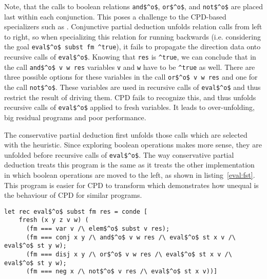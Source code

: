 Note, that the calls to boolean relations \lstinline{and$^o$}, \lstinline{or$^o$}, and \lstinline{not$^o$} are placed last within each conjunction.
This poses a challenge to the CPD-based specializers such as \ecce.
Conjunctive partial deduction unfolds relation calls from left to right, so when specializing this relation for running backwards (i.e. considering the goal \lstinline{eval$^o$ subst fm ^true}), it fails to propagate the direction data onto recursive calls of \lstinline{eval$^o$}.
Knowing that \lstinline{res} is \lstinline{^true}, we can conclude that in the call \lstinline{and$^o$ v w res} variables \lstinline{v} and \lstinline{w} have to be \lstinline{^true} as well.
There are three possible options for these variables in the call \lstinline{or$^o$ v w res} and one for the call \lstinline{not$^o$}.
These variables are used in recursive calls of \lstinline{eval$^o$} and thus restrict the result of driving them.
CPD fails to recognize this, and thus unfolds recursive calls of \lstinline{eval$^o$} applied to fresh variables.
It leads to over-unfolding, big residual programs and poor performance.

The conservative partial deduction first unfolds those calls which are selected with the heuristic.
Since exploring boolean operations makes more sense, they are unfolded before recursive calls of \lstinline{eval$^o$}.
The way conservative partial deduction treats this program is the same as it treats the other implementation in which boolean operations are moved to the left, as shown in listing~\ref{eval:fst}.
This program is easier for CPD to transform which demonstrates how unequal is the behaviour of CPD for similar programs.

\begin{figure*}[!h]
  \centering
  \begin{minipage}{0.95\textwidth}
    \begin{lstlisting}[label={eval:fst}, caption={Evaluator of formulas with boolean operation second}, captionpos=b, frame=tb]
  let rec eval$^o$ subst fm res = conde [
    fresh (x y z v w) (
      (fm === var v /\ elem$^o$ subst v res);
      (fm === conj x y /\ and$^o$ v w res /\ eval$^o$ st x v /\ eval$^o$ st y w);
      (fm === disj x y /\ or$^o$ v w res /\ eval$^o$ st x v /\ eval$^o$ st y w);
      (fm === neg x /\ not$^o$ v res /\ eval$^o$ st x v))]
    \end{lstlisting}
  \end{minipage}
\end{figure*}

